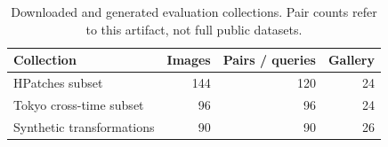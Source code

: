 \begin{table}[htbp]\centering\small
\caption{Downloaded and generated evaluation collections. Pair counts refer to this artifact, not full public datasets.}\label{tab:datasets}
\begin{tabular}{lrrr}
\toprule
Collection & Images & Pairs / queries & Gallery \\
\midrule
HPatches subset & 144 & 120 & 24 \\
Tokyo cross-time subset & 96 & 96 & 24 \\
Synthetic transformations & 90 & 90 & 26 \\
\bottomrule
\end{tabular}\end{table}
